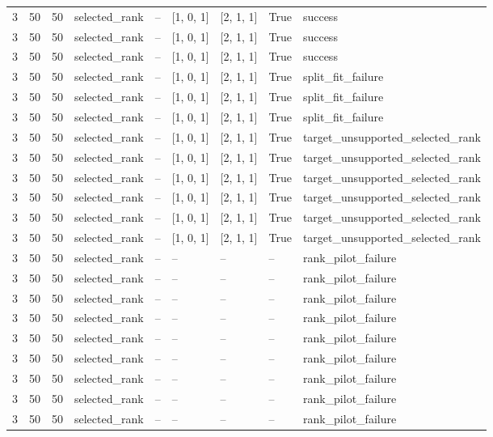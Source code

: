 \begin{longtable}{lllllllll}
3 & 50 & 50 & selected\_rank & -- & [1, 0, 1] & [2, 1, 1] & True & success \\
3 & 50 & 50 & selected\_rank & -- & [1, 0, 1] & [2, 1, 1] & True & success \\
3 & 50 & 50 & selected\_rank & -- & [1, 0, 1] & [2, 1, 1] & True & success \\
3 & 50 & 50 & selected\_rank & -- & [1, 0, 1] & [2, 1, 1] & True & split\_fit\_failure \\
3 & 50 & 50 & selected\_rank & -- & [1, 0, 1] & [2, 1, 1] & True & split\_fit\_failure \\
3 & 50 & 50 & selected\_rank & -- & [1, 0, 1] & [2, 1, 1] & True & split\_fit\_failure \\
3 & 50 & 50 & selected\_rank & -- & [1, 0, 1] & [2, 1, 1] & True & target\_unsupported\_selected\_rank \\
3 & 50 & 50 & selected\_rank & -- & [1, 0, 1] & [2, 1, 1] & True & target\_unsupported\_selected\_rank \\
3 & 50 & 50 & selected\_rank & -- & [1, 0, 1] & [2, 1, 1] & True & target\_unsupported\_selected\_rank \\
3 & 50 & 50 & selected\_rank & -- & [1, 0, 1] & [2, 1, 1] & True & target\_unsupported\_selected\_rank \\
3 & 50 & 50 & selected\_rank & -- & [1, 0, 1] & [2, 1, 1] & True & target\_unsupported\_selected\_rank \\
3 & 50 & 50 & selected\_rank & -- & [1, 0, 1] & [2, 1, 1] & True & target\_unsupported\_selected\_rank \\
3 & 50 & 50 & selected\_rank & -- & -- & -- & -- & rank\_pilot\_failure \\
3 & 50 & 50 & selected\_rank & -- & -- & -- & -- & rank\_pilot\_failure \\
3 & 50 & 50 & selected\_rank & -- & -- & -- & -- & rank\_pilot\_failure \\
3 & 50 & 50 & selected\_rank & -- & -- & -- & -- & rank\_pilot\_failure \\
3 & 50 & 50 & selected\_rank & -- & -- & -- & -- & rank\_pilot\_failure \\
3 & 50 & 50 & selected\_rank & -- & -- & -- & -- & rank\_pilot\_failure \\
3 & 50 & 50 & selected\_rank & -- & -- & -- & -- & rank\_pilot\_failure \\
3 & 50 & 50 & selected\_rank & -- & -- & -- & -- & rank\_pilot\_failure \\
3 & 50 & 50 & selected\_rank & -- & -- & -- & -- & rank\_pilot\_failure \\

\end{longtable}
